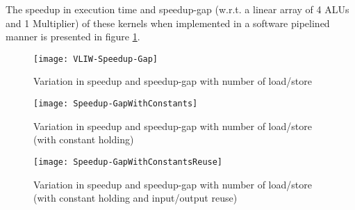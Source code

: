 The speedup in execution time and speedup-gap (w.r.t. a linear array of 4 ALUs and 1 Multiplier) of these kernels when implemented in a software pipelined manner is presented in figure \ref{fig_speedup_linArray}.  
\begin{figure}[!h]
  \centering
    \texttt{[image: VLIW-Speedup-Gap]}
    \caption{Variation in speedup and speedup-gap with number of load/store}
\label{fig_speedup_linArray}
\end{figure}
\begin{figure}[!h]
  \centering
    \texttt{[image: Speedup-GapWithConstants]}
    \caption{Variation in speedup and speedup-gap with number of load/store (with constant holding)}
\label{fig_SpeedupWithConstants}
\end{figure}
\begin{figure}[!h]
  \centering
    \texttt{[image: Speedup-GapWithConstantsReuse]}
    \caption{Variation in speedup and speedup-gap with number of load/store (with constant holding and input/output reuse)}
\label{fig_SpeedupWithConstantsReuse}
\end{figure}
